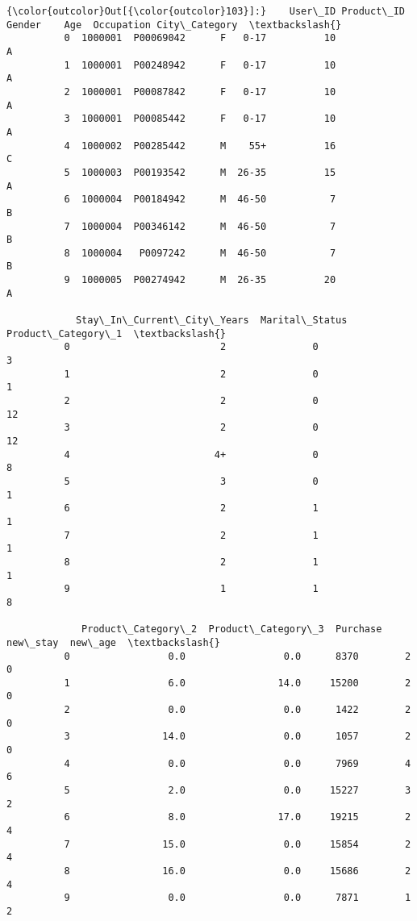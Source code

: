 \documentclass[11pt]{article}
\begin{document}
\begin{Verbatim}[commandchars=\\\{\}]
{\color{outcolor}Out[{\color{outcolor}103}]:}    User\_ID Product\_ID Gender    Age  Occupation City\_Category  \textbackslash{}
          0  1000001  P00069042      F   0-17          10             A   
          1  1000001  P00248942      F   0-17          10             A   
          2  1000001  P00087842      F   0-17          10             A   
          3  1000001  P00085442      F   0-17          10             A   
          4  1000002  P00285442      M    55+          16             C   
          5  1000003  P00193542      M  26-35          15             A   
          6  1000004  P00184942      M  46-50           7             B   
          7  1000004  P00346142      M  46-50           7             B   
          8  1000004   P0097242      M  46-50           7             B   
          9  1000005  P00274942      M  26-35          20             A   
          
            Stay\_In\_Current\_City\_Years  Marital\_Status  Product\_Category\_1  \textbackslash{}
          0                          2               0                   3   
          1                          2               0                   1   
          2                          2               0                  12   
          3                          2               0                  12   
          4                         4+               0                   8   
          5                          3               0                   1   
          6                          2               1                   1   
          7                          2               1                   1   
          8                          2               1                   1   
          9                          1               1                   8   
          
             Product\_Category\_2  Product\_Category\_3  Purchase new\_stay  new\_age  \textbackslash{}
          0                 0.0                 0.0      8370        2        0   
          1                 6.0                14.0     15200        2        0   
          2                 0.0                 0.0      1422        2        0   
          3                14.0                 0.0      1057        2        0   
          4                 0.0                 0.0      7969        4        6   
          5                 2.0                 0.0     15227        3        2   
          6                 8.0                17.0     19215        2        4   
          7                15.0                 0.0     15854        2        4   
          8                16.0                 0.0     15686        2        4   
          9                 0.0                 0.0      7871        1        2   
          

\end{Verbatim}
\end{document}
